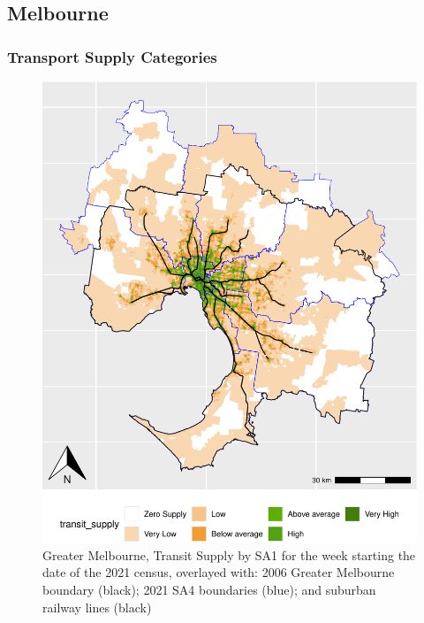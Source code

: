 \documentclass[preprint, 3p,
authoryear]{elsarticle} %
\begin{document}
\hypertarget{melbourne}{%
\subsection{Melbourne}\label{melbourne}}

\hypertarget{transport-supply-categories}{%
\subsubsection{Transport Supply
Categories}\label{transport-supply-categories}}

\begin{figure}
\centering
\includegraphics{ReynoldsCurrieQu2024_files/figure-latex/Greater_Melbourne_2021_SA1_plot-1.pdf}
\caption{Greater Melbourne, Transit Supply by SA1 for the week starting
the date of the 2021 census, overlayed with: 2006 Greater Melbourne
boundary (black); 2021 SA4 boundaries (blue); and suburban railway lines
(black)}
\end{figure}
\end{document}
